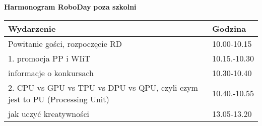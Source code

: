 \documentclass{article}
\begin{document}
\begin{center}
\Large\textbf{Harmonogram RoboDay}
\large\textbf{poza szkolni}
\end{center}
\vspace{1cm}
\begin{center}
\begin{tabular}{|l|l|}
\hline
\textbf{Wydarzenie} & \textbf{Godzina} \\
\hline
Powitanie gości, rozpoczęcie RD & 10.00-10.15 \\
\hline
1. promocja PP i WIiT & 10.15.-10.30 \\
\hline
informacje o konkursach & 10.30-10.40 \\
\hline
2. CPU vs GPU vs TPU vs DPU vs QPU, czyli czym jest to PU (Processing Unit) & 10.40.-10.55 \\
\hline
jak uczyć kreatywności & 13.05-13.20 \\
\hline
\end{tabular}
\end{center}
\end{document}
